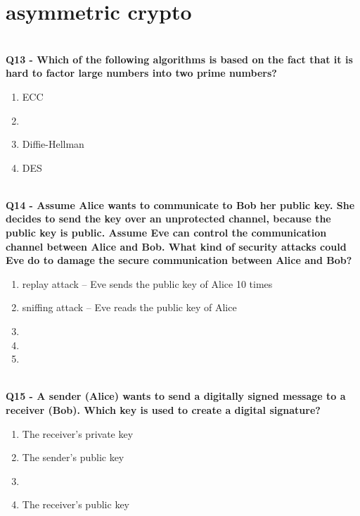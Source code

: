 \section{asymmetric crypto}

\textbf{\\Q13 - Which of the following algorithms is based on the fact that it is hard to factor large numbers into two prime numbers?}
\begin{enumerate}
	\item[A.] ECC
	\item[B.] 
	\item[C.] Diffie-Hellman
	\item[D.] DES
\end{enumerate}

\textbf{\\Q14 - Assume Alice wants to communicate to Bob her public key. She decides to send the key over an unprotected channel, because the public key is public. Assume Eve can control the communication channel between Alice and Bob. What kind of security attacks could Eve do to damage the secure communication between Alice and Bob?}
\begin{enumerate}
	\item[A.] replay attack – Eve sends the public key of Alice 10 times
	\item[B.] sniffing attack – Eve reads the public key of Alice
	\item[C.] 
	\item[D.] 
	\item[E.] 
\end{enumerate}

\textbf{\\Q15 - A sender (Alice) wants to send a digitally signed message to a receiver (Bob). Which key is used to create a digital signature?}
\begin{enumerate}
	\item[A.] The receiver’s private key
	\item[B.] The sender’s public key
	\item[C.] 
	\item[D.] The receiver’s public key
\end{enumerate}

